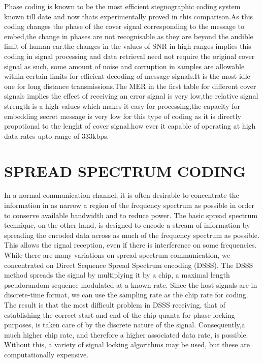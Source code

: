\documentclass[a4paper, 12pt, notitlepage]{report}
\begin{document}
Phase coding is known to be the most efficient stegnographic coding system known till date and now thats experimentally proved in this comparison.As this coding changes the phase of the cover signal corresponding to the message to embed,the change in phases are not recognisable as they are beyond the audible limit of human ear.the changes in the values of SNR in high ranges implies this coding in signal processing and data retrieval need not require the original cover signal as such, some amount of noise and corruption in samples are allowable within certain limits for efficient decoding of message signals.It is the most idle one for long distance transmissions.The MER in the first table for different cover signals implies the effect of receiving an error signal is very low,the relative signal strength is a high values which makes it easy for processing,the capacity for embedding secret message is very low for this type of coding as it is directly propotional to the lenght of cover signal.how ever it capable of operating at high data rates upto range of 333kbps.\\ 

\chapter{SPREAD SPECTRUM CODING}

In a normal communication channel, it is often desirable to concentrate the information in as narrow a region of the frequency spectrum as possible in order to conserve available bandwidth and to reduce power. The basic spread spectrum technique, on the other hand, is designed to encode a stream of information by spreading the encoded data across as much of the frequency spectrum as possible. This allows the signal reception, even if there is interference on some frequencies. While there are many variations on spread spectrum communication, we concentrated on Direct Sequence Spread Spectrum encoding (DSSS). The DSSS method spreads the signal by multiplying it by a chip, a maximal length pseudorandom sequence modulated at a known rate. Since the host signals are in discrete-time format, we can use the sampling rate as the chip rate for coding. The result is that the most difficult problem in DSSS receiving, that of establishing the correct start and end of the chip quanta for phase locking purposes, is taken care of by the discrete nature of the signal. Consequently,a much higher chip rate, and therefore a higher associated data rate, is possible. Without this, a variety of signal locking algorithms may be used, but these are computationally expensive.\\
\end{document}
